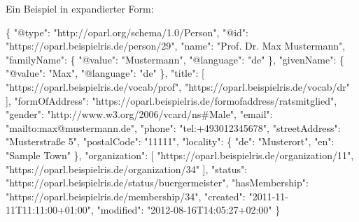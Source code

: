 \documentclass[,a4paper]{article}
\newenvironment{Shaded}{}{}
\newcommand{\DataTypeTok}[1]{\textcolor[rgb]{0.56,0.13,0.00}{{#1}}}
\newcommand{\StringTok}[1]{\textcolor[rgb]{0.25,0.44,0.63}{{#1}}}
\newcommand{\OtherTok}[1]{\textcolor[rgb]{0.00,0.44,0.13}{{#1}}}
\newcommand{\FunctionTok}[1]{\textcolor[rgb]{0.02,0.16,0.49}{{#1}}}
\begin{document}
Ein Beispiel in expandierter Form:

\begin{Shaded}
\begin{Highlighting}[]
\FunctionTok{\{}
    \DataTypeTok{"@type"}\FunctionTok{:} \StringTok{"http://oparl.org/schema/1.0/Person"}\FunctionTok{,}
    \DataTypeTok{"@id"}\FunctionTok{:} \StringTok{"https://oparl.beispielris.de/person/29"}\FunctionTok{,}
    \DataTypeTok{"name"}\FunctionTok{:} \StringTok{"Prof. Dr. Max Mustermann"}\FunctionTok{,}
    \DataTypeTok{"familyName"}\FunctionTok{:} \FunctionTok{\{} 
        \DataTypeTok{"@value"}\FunctionTok{:} \StringTok{"Mustermann"}\FunctionTok{,}
        \DataTypeTok{"@language"}\FunctionTok{:} \StringTok{"de"}
    \FunctionTok{\},}
    \DataTypeTok{"givenName"}\FunctionTok{:} \FunctionTok{\{}
        \DataTypeTok{"@value"}\FunctionTok{:} \StringTok{"Max"}\FunctionTok{,}
        \DataTypeTok{"@language"}\FunctionTok{:} \StringTok{"de"}
    \FunctionTok{\},}
    \DataTypeTok{"title"}\FunctionTok{:} \OtherTok{[}
        \StringTok{"https://oparl.beispielris.de/vocab/prof"}\OtherTok{,}
        \StringTok{"https://oparl.beispielris.de/vocab/dr"}
    \OtherTok{]}\FunctionTok{,}
    \DataTypeTok{"formOfAddress"}\FunctionTok{:} \StringTok{"https://oparl.beispielris.de/formofaddress/ratsmitglied"}\FunctionTok{,}
    \DataTypeTok{"gender"}\FunctionTok{:} \StringTok{"http://www.w3.org/2006/vcard/ns#Male"}\FunctionTok{,}
    \DataTypeTok{"email"}\FunctionTok{:} \StringTok{"mailto:max@mustermann.de"}\FunctionTok{,}
    \DataTypeTok{"phone"}\FunctionTok{:} \StringTok{"tel:+493012345678"}\FunctionTok{,}
    \DataTypeTok{"streetAddress"}\FunctionTok{:} \StringTok{"Musterstraße 5"}\FunctionTok{,}
    \DataTypeTok{"postalCode"}\FunctionTok{:} \StringTok{"11111"}\FunctionTok{,}
    \DataTypeTok{"locality"}\FunctionTok{:} \FunctionTok{\{}
        \DataTypeTok{"de"}\FunctionTok{:} \StringTok{"Musterort"}\FunctionTok{,}
        \DataTypeTok{"en"}\FunctionTok{:} \StringTok{"Sample Town"}
    \FunctionTok{\},}
    \DataTypeTok{"organization"}\FunctionTok{:} \OtherTok{[}
        \StringTok{"https://oparl.beispielris.de/organization/11"}\OtherTok{,}
        \StringTok{"https://oparl.beispielris.de/organization/34"}
    \OtherTok{]}\FunctionTok{,}
    \DataTypeTok{"status"}\FunctionTok{:} \StringTok{"https://oparl.beispielris.de/status/buergermeister"}\FunctionTok{,}
    \DataTypeTok{"hasMembership"}\FunctionTok{:} \StringTok{"https://oparl.beispielris.de/membership/34"}\FunctionTok{,}
    \DataTypeTok{"created"}\FunctionTok{:} \StringTok{"2011-11-11T11:11:00+01:00"}\FunctionTok{,}
    \DataTypeTok{"modified"}\FunctionTok{:} \StringTok{"2012-08-16T14:05:27+02:00"}
\FunctionTok{\}}
\end{Highlighting}
\end{Shaded}
\end{document}
